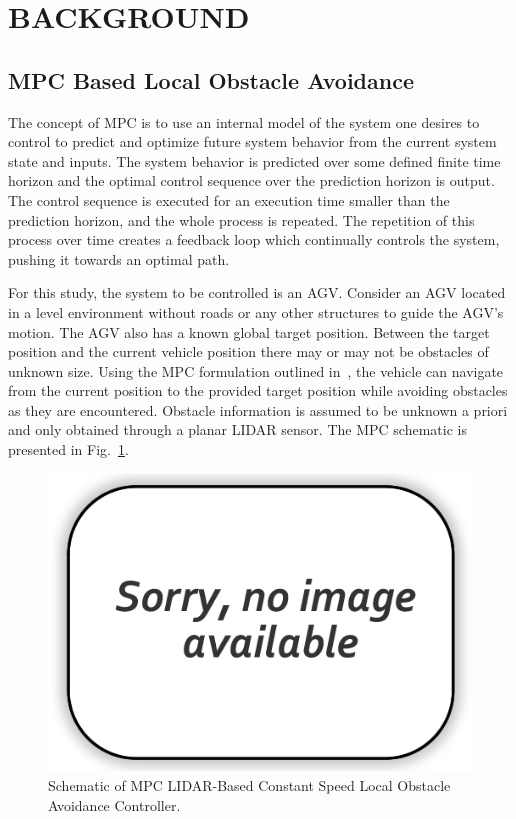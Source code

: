 \documentclass[12pt,twocolumn]{article}
\begin{document}

\section{BACKGROUND}\label{s:background}

\subsection{MPC Based Local Obstacle Avoidance }\label{ss:MPC}
The concept of MPC is to use an internal model of the system one desires to control to predict and optimize future system behavior from the current system state and inputs. The system behavior is predicted over some defined finite time horizon and the optimal control sequence over the prediction horizon is output. The control sequence is executed for an execution time smaller than the prediction horizon, and the whole process is repeated. The repetition of this process over time creates a feedback loop which continually controls the system, pushing it towards an optimal path.

For this study, the system to be controlled is an AGV. Consider an AGV located in a level environment without roads or any other structures to guide the AGV’s motion. The AGV also has a known global target position. Between the target position and the current vehicle position there may or may not be obstacles of unknown size. Using the MPC formulation outlined in~\cite{foo}, the vehicle can navigate from the current position to the provided target position while avoiding obstacles as they are encountered. Obstacle information is assumed to be unknown a priori and only obtained through a planar LIDAR sensor. The MPC schematic is presented in Fig.~\ref{fig:MPC_schematic}.
%
\begin{figure}
	\centering
	\includegraphics[width=\columnwidth]{Figs/no-image.png}
	\caption{\small Schematic of MPC LIDAR-Based Constant Speed Local Obstacle Avoidance Controller.  }    
	\label{fig:MPC_schematic}
\end{figure}
\end{document}
